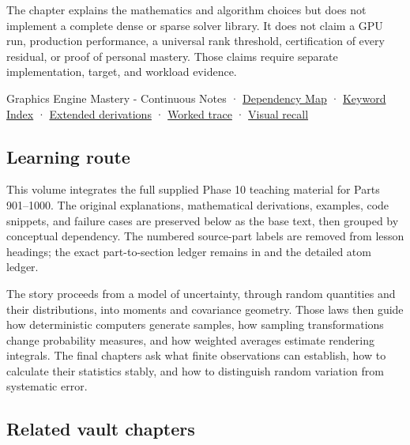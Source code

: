 The chapter explains the mathematics and algorithm choices but does not implement a complete dense or sparse solver library. It does not claim a GPU run, production performance, a universal rank threshold, certification of every residual, or proof of personal mastery. Those claims require separate implementation, target, and workload evidence.

{Graphics Engine Mastery - Continuous Notes} · \hyperref[appendix-4ad47bdd269a]{Dependency Map} · \hyperref[appendix-a6d556a4ef50]{Keyword Index} · \hyperref[02-foundations-ii-ch039-phase-8---linear-systems-and-decompositions]{Extended derivations} · \hyperref[appendix-92ff77d4dfdc-phase-8---from-constraints-to-a-stable-svd-contract]{Worked trace} · \hyperref[appendix-932cf7182ff1]{Visual recall}

\subsection{Learning route}\label{02-foundations-ii-ch039-learning-route}

\hypertarget{02-foundations-ii-ch039-learning-route}{}

This volume integrates the full supplied Phase 10 teaching material for Parts 901--1000. The original explanations, mathematical derivations, examples, code snippets, and failure cases are preserved below as the base text, then grouped by conceptual dependency. The numbered source-part labels are removed from lesson headings; the exact part-to-section ledger remains in  and the detailed atom ledger.

The story proceeds from a model of uncertainty, through random quantities and their distributions, into moments and covariance geometry. Those laws then guide how deterministic computers generate samples, how sampling transformations change probability measures, and how weighted averages estimate rendering integrals. The final chapters ask what finite observations can establish, how to calculate their statistics stably, and how to distinguish random variation from systematic error.

\subsection{Related vault chapters}\label{02-foundations-ii-ch039-related-vault-chapters}

\hypertarget{02-foundations-ii-ch039-related-vault-chapters}{}

